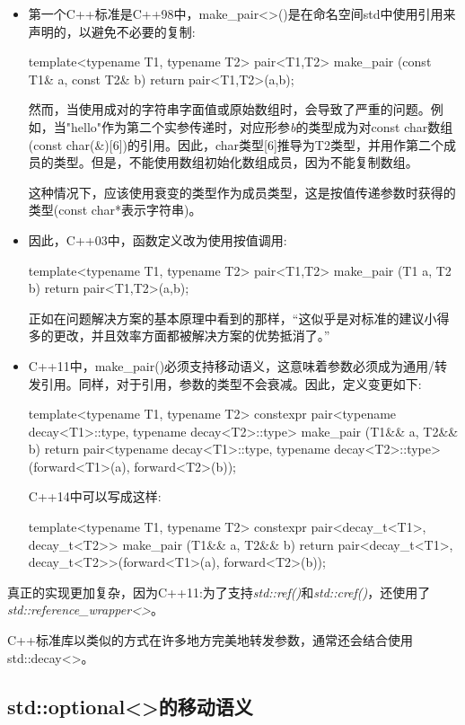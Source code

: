 \begin{itemize}
\item 第一个C++标准是C++98中，make_pair<>()是在命名空间std中使用引用来声明的，以避免不必要的复制:
\begin{cppcode}
template<typename T1, typename T2>
pair<T1,T2> make_pair (const T1& a, const T2& b)
{
	return pair<T1,T2>(a,b);
}
\end{cppcode}
然而，当使用成对的字符串字面值或原始数组时，会导致了严重的问题。例如，当"hello"作为第二个实参传递时，对应形参\textit{b}的类型成为对const char数组(const char(\&)[6])的引用。因此，char类型[6]推导为T2类型，并用作第二个成员的类型。但是，不能使用数组初始化数组成员，因为不能复制数组。

这种情况下，应该使用衰变的类型作为成员类型，这是按值传递参数时获得的类型(const char*表示字符串)。

\item 因此，C++03中，函数定义改为使用按值调用:
\begin{cppcode}
template<typename T1, typename T2>
pair<T1,T2> make_pair (T1 a, T2 b)
{
	return pair<T1,T2>(a,b);
}
\end{cppcode}
正如在问题解决方案的基本原理中看到的那样，“这似乎是对标准的建议小得多的更改，并且效率方面都被解决方案的优势抵消了。”

\item C++11中，make_pair()必须支持移动语义，这意味着参数必须成为通用/转发引用。同样，对于引用，参数的类型不会衰减。因此，定义变更如下:
\begin{cppcode}
template<typename T1, typename T2>
constexpr pair<typename decay<T1>::type, typename decay<T2>::type>
make_pair (T1&& a, T2&& b)
{
	return pair<typename decay<T1>::type,
	typename decay<T2>::type>(forward<T1>(a),
	forward<T2>(b));
}
\end{cppcode}
C++14中可以写成这样:
\begin{cppcode}
template<typename T1, typename T2>
constexpr pair<decay_t<T1>, decay_t<T2>>
make_pair (T1&& a, T2&& b)
{
	return pair<decay_t<T1>, decay_t<T2>>(forward<T1>(a), forward<T2>(b));
}
\end{cppcode}
\end{itemize}

真正的实现更加复杂，因为C++11:为了支持\textit{std::ref()}和\textit{std::cref()}，还使用了\textit{std::reference_wrapper<>}。

C++标准库以类似的方式在许多地方完美地转发参数，通常还会结合使用std::decay<>。

\subsection{std::optional<>的移动语义}

